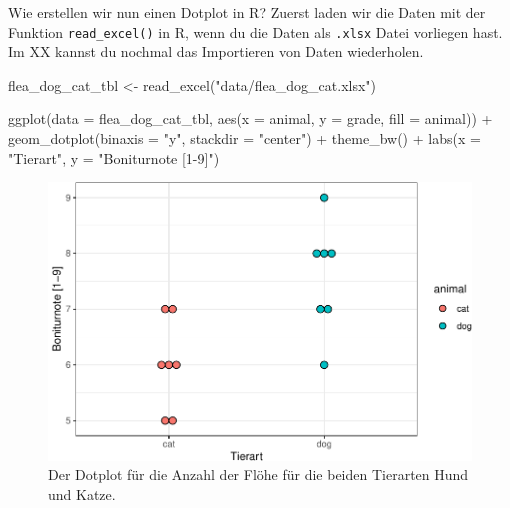 \documentclass[
  letterpaper,
  DIV=11,
  oneside]{scrreport}
\newenvironment{Shaded}{\begin{snugshade}}{\end{snugshade}}
\newcommand{\AttributeTok}[1]{\textcolor[rgb]{0.40,0.45,0.13}{#1}}
\newcommand{\FunctionTok}[1]{\textcolor[rgb]{0.28,0.35,0.67}{#1}}
\newcommand{\NormalTok}[1]{\textcolor[rgb]{0.00,0.23,0.31}{#1}}
\newcommand{\OtherTok}[1]{\textcolor[rgb]{0.00,0.23,0.31}{#1}}
\newcommand{\SpecialCharTok}[1]{\textcolor[rgb]{0.37,0.37,0.37}{#1}}
\newcommand{\StringTok}[1]{\textcolor[rgb]{0.13,0.47,0.30}{#1}}
\begin{document}
Wie erstellen wir nun einen Dotplot in R? Zuerst laden wir die Daten mit
der Funktion \texttt{read\_excel()} in R, wenn du die Daten als
\texttt{.xlsx} Datei vorliegen hast. Im XX kannst du nochmal das
Importieren von Daten wiederholen.

\begin{Shaded}
\begin{Highlighting}[]
\NormalTok{flea\_dog\_cat\_tbl }\OtherTok{\textless{}{-}} \FunctionTok{read\_excel}\NormalTok{(}\StringTok{"data/flea\_dog\_cat.xlsx"}\NormalTok{)}
\end{Highlighting}
\end{Shaded}

\begin{Shaded}
\begin{Highlighting}[]
\FunctionTok{ggplot}\NormalTok{(}\AttributeTok{data =}\NormalTok{ flea\_dog\_cat\_tbl, }\FunctionTok{aes}\NormalTok{(}\AttributeTok{x =}\NormalTok{ animal, }\AttributeTok{y =}\NormalTok{ grade,}
                                    \AttributeTok{fill =}\NormalTok{ animal)) }\SpecialCharTok{+}
  \FunctionTok{geom\_dotplot}\NormalTok{(}\AttributeTok{binaxis =} \StringTok{"y"}\NormalTok{, }\AttributeTok{stackdir =} \StringTok{"center"}\NormalTok{) }\SpecialCharTok{+}
  \FunctionTok{theme\_bw}\NormalTok{() }\SpecialCharTok{+}
  \FunctionTok{labs}\NormalTok{(}\AttributeTok{x =} \StringTok{"Tierart"}\NormalTok{, }\AttributeTok{y =} \StringTok{"Boniturnote [1{-}9]"}\NormalTok{) }
\end{Highlighting}
\end{Shaded}

\begin{figure}[H]

{\centering \includegraphics{./eda-ggplot_files/figure-pdf/fig-dotplot-flea-eda-0-1.pdf}

}

\caption{\label{fig-dotplot-flea-eda-0}Der Dotplot für die Anzahl der
Flöhe für die beiden Tierarten Hund und Katze.}

\end{figure}
\end{document}
